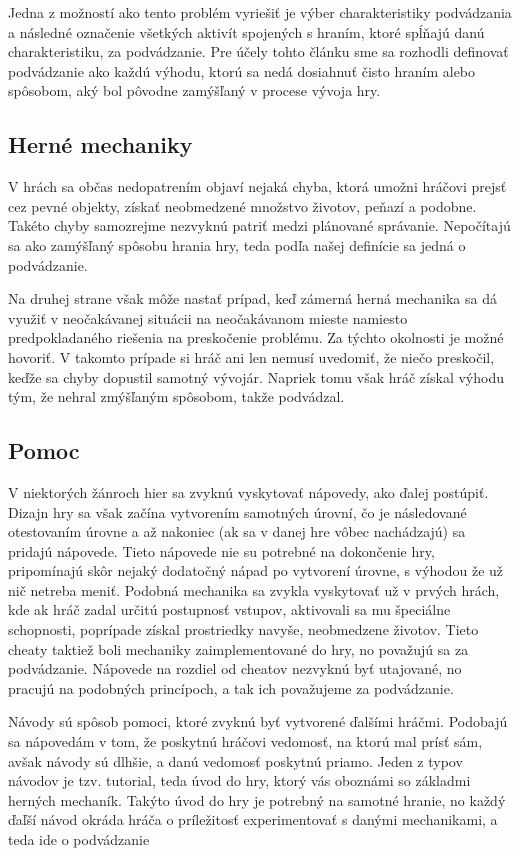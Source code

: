 \documentclass[10pt, oneside, slovak,a4paper]{article}
\begin{document}
Jedna z možností ako tento problém vyriešiť je výber charakteristiky podvádzania a následné označenie všetkých aktivít spojených s hraním, ktoré spĺňajú danú charakteristiku, za podvádzanie. Pre účely tohto článku sme sa rozhodli definovať podvádzanie ako každú výhodu, ktorú sa nedá dosiahnuť čisto hraním alebo spôsobom, aký bol pôvodne zamýšľaný v procese vývoja hry.

\subsection{Herné mechaniky}
V hrách sa občas nedopatrením objaví nejaká chyba, ktorá umožni hráčovi prejsť cez pevné objekty, získať neobmedzené množstvo životov, peňazí a podobne. Takéto chyby samozrejme nezvyknú patriť medzi plánované správanie. Nepočítajú sa ako zamýšľaný spôsobu hrania hry, teda podľa našej definície sa jedná o podvádzanie.

Na druhej strane však môže nastať prípad, keď zámerná herná mechanika sa dá využiť v neočakávanej situácii na neočakávanom mieste namiesto predpokladaného riešenia na preskočenie problému. Za týchto okolnosti je možné hovoriť. V takomto prípade si hráč ani len nemusí uvedomiť, že niečo preskočil, keďže sa chyby dopustil samotný vývojár. Napriek tomu však hráč získal výhodu tým, že nehral zmýšľaným spôsobom, takže podvádzal.

\subsection{Pomoc}
V niektorých žánroch hier sa zvyknú vyskytovať nápovedy, ako ďalej postúpiť. Dizajn hry sa však začína vytvorením samotných úrovní, čo je následované otestovaním úrovne a až nakoniec  (ak sa v danej hre vôbec nachádzajú) sa pridajú nápovede. Tieto nápovede nie su potrebné na dokončenie hry, pripomínajú skôr nejaký dodatočný nápad po vytvorení úrovne, s výhodou že už nič netreba meniť. Podobná mechanika sa zvykla vyskytovať už v prvých hrách, kde ak hráč zadal určitú postupnosť vstupov, aktivovali sa mu špeciálne schopnosti, poprípade získal prostriedky navyše, neobmedzene životov. Tieto cheaty taktiež boli mechaniky zaimplementované do hry, no považujú sa za podvádzanie. Nápovede na rozdiel od cheatov nezvyknú byť utajované, no pracujú na podobných princípoch, a tak ich považujeme za podvádzanie.

Návody sú spôsob pomoci, ktoré zvyknú byť vytvorené ďalšími hráčmi. Podobajú sa nápovedám v tom, že poskytnú hráčovi vedomosť, na ktorú mal prísť sám, avšak návody sú dlhšie, a danú vedomosť poskytnú priamo. Jeden z typov návodov je tzv. tutorial, teda úvod do hry, ktorý vás oboznámi so základmi herných mechaník. Takýto úvod do hry je potrebný na samotné hranie, no každý ďaľší návod okráda hráča o príležitosť experimentovať s danými mechanikami, a teda ide o podvádzanie
\end{document}
